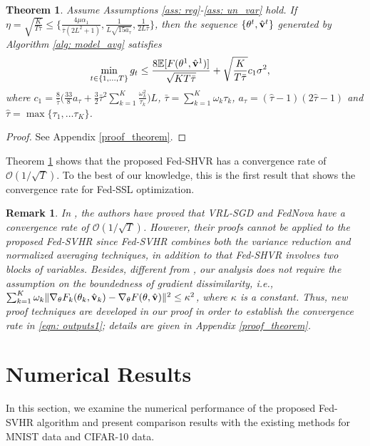 \documentclass[twoside,journal]{IEEEtran}
\def\VectorFont{\bf}
\newcommand{\vv}{{\VectorFont v}}
\newtheorem{theorem}{Theorem}
\newtheorem{remark}{Remark}
\begin{document}
\begin{theorem}\label{theo: 1}
Assume Assumptions \ref{ass: reg}-\ref{ass: un_var} hold. If $\eta=\sqrt{\frac{K}{T\bar{\tau}}}\leq \{\frac{4\mu\alpha_1}{\bar{\tau}(2L^2+1 )},\frac{1}{L\sqrt{15a_{\tau}}},\frac{1}{2L\bar{\tau}}\}$, then the sequence
$\{\theta^t,\hat{\vv}^t\}$ generated by Algorithm \ref{alg: model_avg} satisfies
\begin{align}\label{eqn: outputs1}
\min_{t\in\{1,\ldots,T\}}g_t&\leq \frac{8\mathbb{E}[F(\theta^{1},\hat{\vv}^1)]}{\sqrt{KT\bar{\tau}}}
+\sqrt{\frac{K}{T\bar{\tau}}}c_1\sigma^2,
\end{align}
where  $c_1=\frac{8}{ \bar{\tau}}\Big(\frac{33}{8}a_{\tau}
+\frac{3}{2}\bar{\tau}^2\sum_{k=1}^K\frac{\omega_k^2}{\tau_k}\Big)L$, $\bar{\tau}=\sum_{k=1}^K\omega_k\tau_k$, $a_{\tau}=(\hat{\tau}-1)(2\hat{\tau}-1)$ and $\hat{\tau}=\max\{\tau_1,\ldots\tau_K\}$.
\end{theorem}
\begin{proof}
See Appendix \ref{proof_theorem}.
\end{proof}
Theorem \ref{theo: 1} shows that the proposed Fed-SHVR has a convergence rate of $\mathcal{O}(1/\sqrt{T})$. To the best of our knowledge, this is the first result that shows the convergence rate for Fed-SSL optimization.
\begin{remark}{\rm
In \cite{liang2019variance,wang2020tackling}, the authors have proved that VRL-SGD and FedNova have a  convergence rate of $\mathcal{O}(1/\sqrt{T})$.
However, their proofs cannot be applied to the proposed Fed-SVHR since Fed-SVHR combines both the variance reduction and normalized averaging techniques, in addition to that Fed-SHVR involves two blocks of variables. Besides, different from \cite{wang2020tackling}, our analysis does not require the assumption on the boundedness of gradient dissimilarity, i.e., $\sum_{k=1}^K\omega_k\|\nabla_{\theta} F_k(\theta_k,\hat{\vv}_{k})-\nabla_{\theta} F(\theta,\hat{\vv})\|^2\leq \kappa^2$, where $\kappa$ is a constant. Thus, new  proof techniques are developed in our proof in order
 to establish the convergence rate in \eqref{eqn: outputs1}; details are given in Appendix \ref{proof_theorem}.}
\end{remark}
\section{Numerical Results}\label{sec: Simu}
In this section, we examine the numerical performance of the proposed Fed-SVHR algorithm
and present comparison results with the existing methods for MNIST data and CIFAR-10 data.
\end{document}
